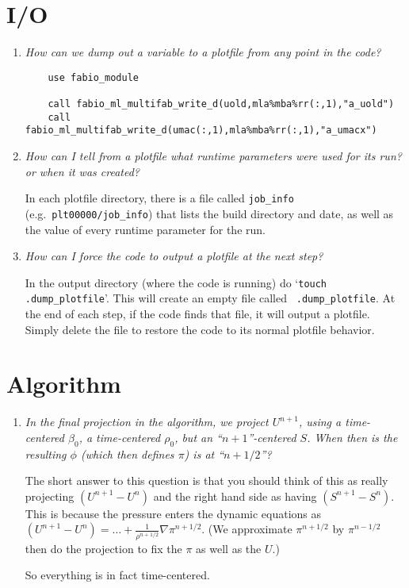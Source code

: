 \section{I/O}

\begin{enumerate}

\item {\em How can we dump out a variable to a plotfile from any point in the
   code?} 
%
\begin{verbatim}
    use fabio_module

    call fabio_ml_multifab_write_d(uold,mla%mba%rr(:,1),"a_uold")
    call fabio_ml_multifab_write_d(umac(:,1),mla%mba%rr(:,1),"a_umacx")
\end{verbatim}



\item {\em How can I tell from a plotfile what runtime parameters were
   used for its run? or when it was created?}

   In each plotfile directory, there is a file called {\tt job\_info}
   (e.g.\ {\tt plt00000/job\_info}) that lists the build directory and
   date, as well as the value of every runtime parameter for the run.


\item {\em How can I force the code to output a plotfile at the next
   step?}

   In the output directory (where the code is running) do `{\tt touch
     .dump\_plotfile}'.  This will create an empty file called {\tt
     .dump\_plotfile}.  At the end of each step, if the code finds
   that file, it will output a plotfile.  Simply delete the file to
   restore the code to its normal plotfile behavior.

\end{enumerate}



\section{Algorithm}

\begin{enumerate}

\item {\em In the final projection in the algorithm, we project
  $U^{n+1}$, using a time-centered $\beta_0$, a time-centered $\rho_0$, but
  an ``$n+1$''-centered $S$.  When then is the resulting $\phi$ (which then
  defines $\pi$) is at ``$n+1/2$''?}

  The short answer to this question is that you should think of this
  as really projecting  $(U^{n+1} - U^n)$ and the right hand side as having
  $(S^{n+1} - S^n)$.  This is because the pressure enters the dynamic equations as
  $(U^{n+1} - U^n) = \ldots + \frac{1}{\rho^{n+1/2}} \nabla \pi^{n+1/2}$.
  (We approximate $\pi^{n+1/2}$ by $\pi^{n-1/2}$ then do the projection to fix the
  $\pi$ as well as the $U$.)

  So everything is in fact time-centered.

\end{enumerate}
